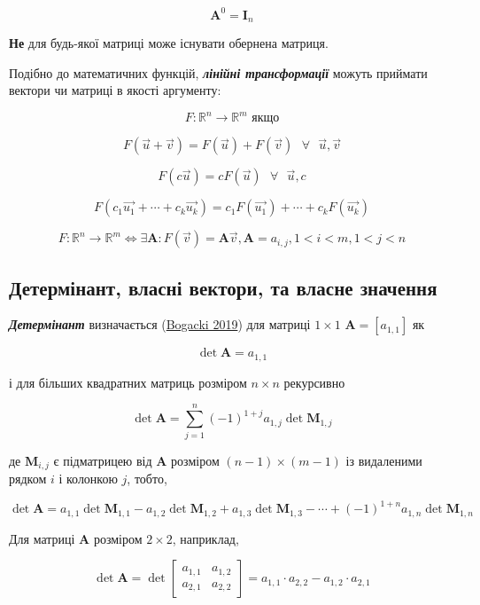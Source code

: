 \documentclass[
  11pt,
]{book}
\begin{document}
\[\mathbf{A}^0 = \mathbf{I}_n\]

\textbf{Не} для будь-якої матриці може існувати обернена матриця.

Подібно до математичних функцій, \textbf{\emph{лінійні трансформації}} можуть приймати вектори чи матриці в якості аргументу:

\[F: \mathbb{R}^n \rightarrow \mathbb{R}^m \text{ якщо}\]

\[F(\vec{u} + \vec{v}) = F(\vec{u}) + F(\vec{v}) \text{ } \forall \text{ } \vec{u}, \vec{v}\]

\[F(c \vec{u}) = c F(\vec{u}) \text{ } \forall \text{ } \vec{u}, c\]

\[F(c_1 \vec{u_1} + \cdots + c_k \vec{u_k}) = c_1 F(\vec{u_1}) + \cdots + c_k F(\vec{u_k})\]

\[F: \mathbb{R}^n \rightarrow \mathbb{R}^m \iff \exists \mathbf{A}: F(\vec{v}) = \mathbf{A} \vec{v}, \mathbf{A} = a_{i, j}, 1 < i<m, 1 < j < n\]

\subsection{Детермінант, власні вектори, та власне значення}\label{ux434ux435ux442ux435ux440ux43cux456ux43dux430ux43dux442-ux432ux43bux430ux441ux43dux456-ux432ux435ux43aux442ux43eux440ux438-ux442ux430-ux432ux43bux430ux441ux43dux435-ux437ux43dux430ux447ux435ux43dux43dux44f}

\textbf{\emph{Детермінант}} визначається (\href{https://books.google.com/books/about/Linear_Algebra.html?id=P8BZzAEACAAJ}{Bogacki 2019}) для матриці \(1 \times 1\) \(\mathbf{A} = [a_{1, 1}]\) як

\[\det \mathbf{A} = a_{1, 1}\]

і для більших квадратних матриць розміром \(n \times n\) рекурсивно

\[\det \mathbf{A} = \sum \limits_{j=1}^n (-1)^{1+j} a_{1, j} \det \mathbf{M}_{1,j}\]

де \(\mathbf{M}_{i,j}\) є підматрицею від \(\mathbf{A}\) розміром \((n - 1) \times (m - 1)\) із видаленими рядком \(i\) і колонкою \(j\), тобто,

\[\det \mathbf{A} = a_{1,1} \det \mathbf{M}_{1,1} - a_{1,2} \det \mathbf{M}_{1,2} + a_{1,3} \det \mathbf{M}_{1,3} - \cdots + (-1)^{1+n} a_{1, n} \det \mathbf{M}_{1,n}\]

Для матриці \(\mathbf{A}\) розміром \(2 \times 2\), наприклад,

\[\det \mathbf{A} = \det \begin{bmatrix}
a_{1, 1} & a_{1, 2} \\
a_{2, 1} & a_{2, 2}
\end{bmatrix} = a_{1, 1} \cdot a_{2, 2} - a_{1, 2} \cdot a_{2, 1}\]
\end{document}
